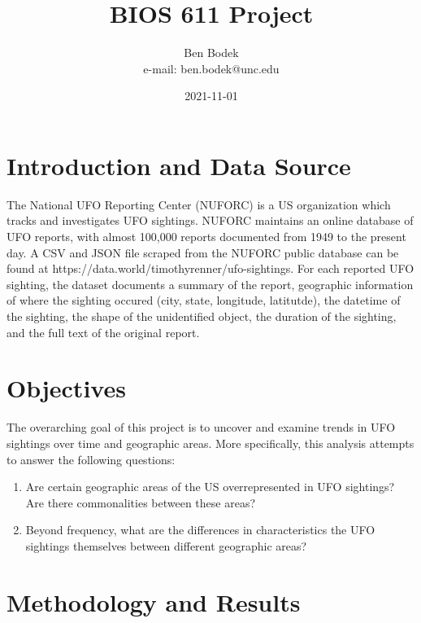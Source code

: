\documentclass{article}
\begin{document}
\title{BIOS 611 Project}
\author{Ben Bodek \\ e-mail: ben.bodek@unc.edu}
\date{2021-11-01}
\maketitle

\section{Introduction and Data Source}
  \par The National UFO Reporting Center (NUFORC) is a US organization which tracks and investigates UFO sightings. NUFORC maintains an online database of UFO reports, with almost 100,000 reports documented from 1949 to the present day. A CSV and JSON file scraped from the NUFORC public database can be found at https://data.world/timothyrenner/ufo-sightings. For each reported UFO sighting, the dataset documents a summary of the report, geographic information of where the sighting occured (city, state, longitude, latitutde), the datetime of the sighting, the shape of the unidentified object, the duration of the sighting, and the full text of the original report.

\section {Objectives}
  \par The overarching goal of this project is to uncover and examine trends in UFO sightings over time and geographic areas. More specifically, this analysis attempts to answer the following questions:
  \begin{enumerate}
    \item Are certain geographic areas of the US overrepresented in UFO sightings? Are there commonalities between these areas?
    \item Beyond frequency, what are the differences in characteristics the UFO sightings themselves between different geographic areas?
  \end{enumerate}
  
\section{Methodology and Results}
\end{document}
